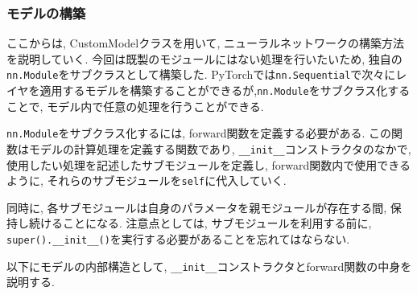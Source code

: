 \documentclass[dvipdfmx]{jsarticle}
\begin{document}
\subsubsection{モデルの構築}
ここからは, CustomModelクラスを用いて, ニューラルネットワークの構築方法を説明していく.
今回は既製のモジュールにはない処理を行いたいため, 独自の\verb|nn.Module|をサブクラスとして構築した.
PyTorchでは\verb|nn.Sequential|で次々にレイヤを適用するモデルを構築することができるが,\verb|nn.Module|をサブクラス化することで, モデル内で任意の処理を行うことができる.

\verb|nn.Module|をサブクラス化するには, forward関数を定義する必要がある.
この関数はモデルの計算処理を定義する関数であり, \verb|__init__|コンストラクタのなかで, 使用したい処理を記述したサブモジュールを定義し, forward関数内で使用できるように, それらのサブモジュールを\verb|self|に代入していく.

同時に, 各サブモジュールは自身のパラメータを親モジュールが存在する間, 保持し続けることになる.
注意点としては, サブモジュールを利用する前に, \verb|super().__init__()|を実行する必要があることを忘れてはならない.

以下にモデルの内部構造として, \verb|__init__|コンストラクタとforward関数の中身を説明する.
\end{document}
